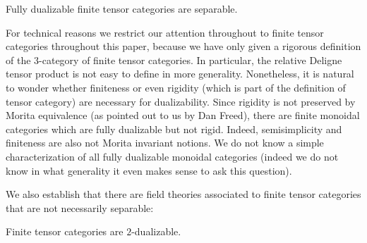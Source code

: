 \documentclass{amsart}
\begin{document}
\begin{maintheorem}
Fully dualizable finite tensor categories are separable.
\end{maintheorem}

For technical reasons we restrict our attention throughout to finite tensor categories throughout this paper, because we have only given a rigorous definition of the $3$-category of finite tensor categories.  In particular, the relative Deligne tensor product is not easy to define in more generality.  Nonetheless, it is natural to wonder whether finiteness or even rigidity (which is part of the definition of tensor category) are necessary for dualizability.  Since rigidity is not preserved by Morita equivalence (as pointed out to us by Dan Freed), there are finite monoidal categories which are fully dualizable but not rigid.  Indeed, semisimplicity and finiteness are also not Morita invariant notions.  We do not know a simple characterization of all fully dualizable monoidal categories (indeed we do not know in what generality it even makes sense to ask this question).


We also establish that there are field theories associated to finite tensor categories that are not necessarily separable:

\begin{maintheorem}
Finite tensor categories are $2$-dualizable.
\end{maintheorem}
\end{document}
